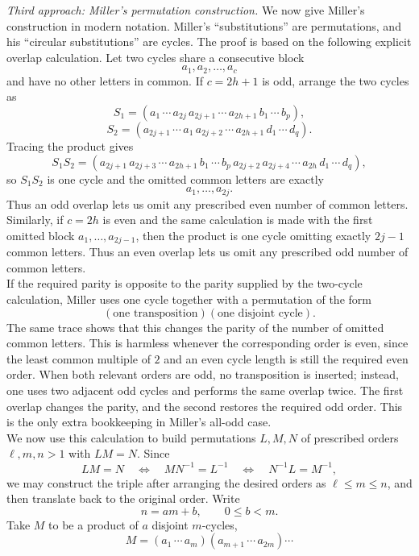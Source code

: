 \documentclass[../Odyssey_Project.tex]{subfiles}
\begin{document}
\begin{solution}
\smallskip\noindent\emph{Third approach: Miller's permutation construction.}
We now give Miller's construction in modern notation. Miller's ``substitutions'' are permutations, and his ``circular substitutions'' are cycles. The proof is based on the following explicit overlap calculation. Let two cycles share a consecutive block
\[
    a_1,a_2,\dots,a_c
\]
and have no other letters in common. If \(c=2h+1\) is odd, arrange the two cycles as
\[
    S_1=(a_1\,\cdots\,a_{2j}\,a_{2j+1}\,\cdots\,a_{2h+1}\,b_1\,\cdots\,b_p),
\]
\[
    S_2=(a_{2j+1}\,\cdots\,a_1\,a_{2j+2}\,\cdots\,a_{2h+1}\,d_1\,\cdots\,d_q).
\]
Tracing the product gives
\[
    S_1S_2
    =
    (a_{2j+1}\,a_{2j+3}\,\cdots\,a_{2h+1}\,
     b_1\,\cdots\,b_p\,
     a_{2j+2}\,a_{2j+4}\,\cdots\,a_{2h}\,
     d_1\,\cdots\,d_q),
\]
so \(S_1S_2\) is one cycle and the omitted common letters are exactly
\[
    a_1,\dots,a_{2j}.
\]
Thus an odd overlap lets us omit any prescribed even number of common letters. Similarly, if \(c=2h\) is even and the same calculation is made with the first omitted block \(a_1,\dots,a_{2j-1}\), then the product is one cycle omitting exactly \(2j-1\) common letters. Thus an even overlap lets us omit any prescribed odd number of common letters. \\
If the required parity is opposite to the parity supplied by the two-cycle calculation, Miller uses one cycle together with a permutation of the form
\[
    (\text{one transposition})(\text{one disjoint cycle}).
\]
The same trace shows that this changes the parity of the number of omitted common letters. This is harmless whenever the corresponding order is even, since the least common multiple of \(2\) and an even cycle length is still the required even order. When both relevant orders are odd, no transposition is inserted; instead, one uses two adjacent odd cycles and performs the same overlap twice. The first overlap changes the parity, and the second restores the required odd order. This is the only extra bookkeeping in Miller's all-odd case. \\
We now use this calculation to build permutations \(L,M,N\) of prescribed orders \(\ell,m,n>1\) with \(LM=N\). Since
\[
    LM=N
    \quad\Longleftrightarrow\quad
    MN^{-1}=L^{-1}
    \quad\Longleftrightarrow\quad
    N^{-1}L=M^{-1},
\]
we may construct the triple after arranging the desired orders as \(\ell \leq m \leq n\), and then translate back to the original order. Write
\[
    n=am+b,\qquad 0\leq b<m.
\]
Take \(M\) to be a product of \(a\) disjoint \(m\)-cycles,
\[
    M=(a_1\,\cdots\,a_m)(a_{m+1}\,\cdots\,a_{2m})\cdots
\]
\end{solution}
\end{document}
